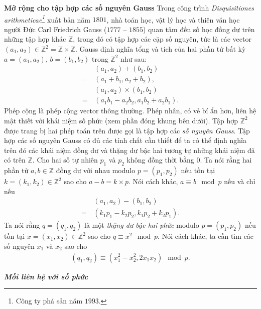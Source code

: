 \begin{multicols}{2}
\begin{tBox}
	\end{tBox}
	\textbf{\color{toanhocdoisong}Mở rộng cho tập hợp các số nguyên Gauss}
	\vskip 0.1cm
	Trong công trình \textit{Disquisitiones arithmeticae\footnote[5]{\color{toanhocdoisong}Công ty phá sản năm $1993$.}}  xuất bản năm $1801$, nhà toán học, vật lý học và thiên văn học người Đức Carl Friedrich Gauss ($1777$ -- $1855$) quan tâm đến số học đồng dư trên những tập hợp khác $\mathbb Z$, trong đó có tập hợp các cặp số nguyên, tức là các vector $(a_1, a_2) \in \mathbb Z^2 = \mathbb Z \times \mathbb Z$.
	\vskip 0.1cm
	Gauss định nghĩa tổng và tích của hai phần tử bất kỳ $a = (a_1, a_2)$, $b = (b_1, b_2)$ trong $\mathbb Z^2$ như sau:
	\begin{align*}
		&(a_1, a_2) + (b_1, b_2) \\
		= \,&(a_1 + b_1, a_2 + b_2), \\
		&(a_1, a_2) \times (b_1, b_2) \\
		= \,&(a_1  b_1 - a_2  b_2, a_1  b_2 + a_2  b_1).
	\end{align*}
	Phép cộng là phép cộng vector thông thường. Phép nhân, có vẻ bí ẩn hơn, liên hệ mật thiết với khái niệm số phức (xem phần đóng khung bên dưới).
	\vskip 0.1cm
	Tập hợp $\mathbb Z^2$ được trang bị hai phép toán trên được gọi là tập hợp các {\em số nguyên Gauss}. Tập hợp các số nguyên Gauss có đủ các tính chất cần thiết để ta có thể định nghĩa trên đó các khái niệm đồng dư và thặng dư bậc hai tương tự những khái niệm đã có trên $\mathbb Z$.
	\vskip 0.1cm
	Cho hai số tự nhiên $p_1$ và $p_2$ không đồng thời bằng $0$. Ta nói rằng hai phần tử $a, b \in \mathbb Z$ đồng dư với nhau modulo $p = (p_1, p_2)$ nếu tồn tại $k = (k_1, k_2) \in \mathbb Z^2$ sao cho $a - b = k \times p$. Nói cách khác, $a \equiv b \mod{p}$ nếu và chỉ nếu
	\begin{align*}
		&(a_1, a_2) - (b_1, b_2) \\
		= \,&(k_1 p_1 - k_2 p_2, k_1 p_2 + k_2 p_1).
	\end{align*}
	Ta nói rằng $q = (q_1, q_2)$ là một {\em thặng dư bậc hai phức} modulo $p = (p_1, p_2)$ nếu tồn tại $x = (x_1, x_2) \in \mathbb Z^2$ sao cho $q \equiv x^2 \mod{p}$. Nói cách khác, ta cần tìm các số nguyên $x_1$ và $x_2$ sao cho
	\begin{align*}
		(q_1, q_2) \equiv (x_1^2 - x_2^2, 2 x_1 x_2) \mod{p}.
	\end{align*}
	\vskip 0.1cm
	\begin{tBox}
		\textbf{\textit{\color{toanhocdoisong}Mối liên hệ với số phức}}
		\vskip 0.1cm
		\begin{figure}

\end{figure}
\end{tBox}
\end{multicols}
